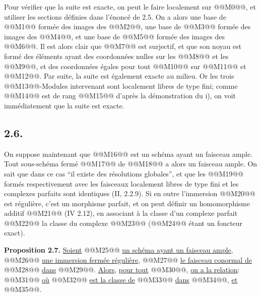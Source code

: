 
Pour vérifier que la suite est exacte, on peut le faire localement sur @@M0@@, et utiliser les sections définies dans l'énoncé de 2.5. On a alors une base de @@M1@@ formée des images des @@M2@@, une base de @@M3@@ formée des images des @@M4@@, et une base de @@M5@@ formée des images des @@M6@@. Il est alors clair que @@M7@@ est surjectif, et que son noyau est formé des éléments ayant des coordonnées nulles sur les @@M8@@ et les @@M9@@, et des coordonnées égales pour tout @@M10@@ sur @@M11@@ et @@M12@@. Par suite, la suite est également exacte au milieu. Or les trois @@M13@@-Modules intervenant sont localement libres de type fini; comme @@M14@@ est de rang @@M15@@ d'après la démonstration du i), on voit immédiatement que la suite est exacte.

\subsection*{2.6.}
On suppose maintenant que @@M16@@ est un schéma ayant un faisceau ample. Tout sous-schéma fermé @@M17@@ de @@M18@@ a alors un faisceau ample. On sait que dans ce cas ``il existe des résolutions globales'', et que les @@M19@@ formés respectivement avec les faisceaux localement libres de type fini et les complexes parfaits sont identiques (II, 2.2.9). Si en outre l'immersion @@M20@@ est régulière, c'est un morphisme parfait, et on peut définir un homomorphisme additif @@M21@@ (IV 2.12), en associant à la classe d'un complexe parfait @@M22@@ la classe du complexe @@M23@@ (@@M24@@ étant un foncteur exact).

\textbf{Proposition 2.7.} \uline{Soient} @@M25@@ \uline{un schéma ayant un faisceau ample}, @@M26@@ \uline{une immersion fermée régulière}, @@M27@@ \uline{le faisceau conormal de} @@M28@@ \uline{dans} @@M29@@. \uline{Alors}, \uline{pour tout} @@M30@@, \uline{on a la relation}:
@@M31@@
\uline{où} @@M32@@ \uline{est la classe de} @@M33@@ \uline{dans} @@M34@@, \uline{et} @@M35@@.


